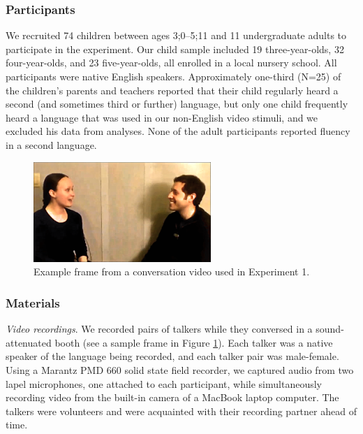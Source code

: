 \documentclass[authoryear, 12pt]{elsarticle}
\begin{document}
\subsubsection{Participants}

We recruited 74 children between ages 3;0--5;11 and 11 undergraduate adults to participate in the experiment. Our child sample included 19 three-year-olds, 32 four-year-olds, and 23 five-year-olds, all enrolled in a local nursery school. All participants were native English speakers. Approximately one-third (N=25) of the children's parents and teachers reported that their child regularly heard a second (and sometimes third or further) language, but only one child frequently heard a language that was used in our non-English video stimuli, and we excluded his data from analyses. None of the adult participants reported fluency in a second language.

\begin{figure}[t]
\begin{center}
\includegraphics[width=0.6\textwidth]{figures/FIG-FL-stim.png}
\end{center}
\caption{Example frame from a conversation video used in Experiment 1.} 
\label{fig:speakers}
\end{figure}

\subsubsection{Materials}

\textit{Video recordings}. We recorded pairs of talkers while they conversed in a sound-attenuated booth (see a sample frame in Figure \ref{fig:speakers}). Each talker was a native speaker of the language being recorded, and each talker pair was male-female. Using a Marantz PMD 660 solid state field recorder, we captured audio from two lapel microphones, one attached to each participant, while simultaneously recording video from the built-in camera of a MacBook laptop computer. The talkers were volunteers and were acquainted with their recording partner ahead of time. 
\end{document}
